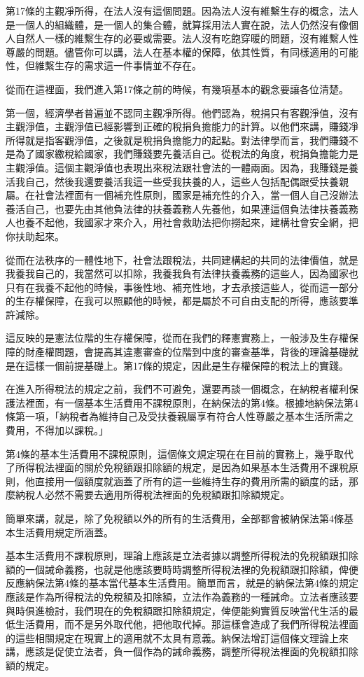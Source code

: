 \documentclass[]{ctexbook}
\begin{document}
第17條的主觀凈所得，在法人沒有這個問題。因為法人沒有維繫生存的概念，法人是一個人的組織體，是一個人的集合體，就算採用法人實在說，法人仍然沒有像個人自然人一樣的維繫生存的必要或需要。法人沒有吃飽穿暖的問題，沒有維繫人性尊嚴的問題。儘管你可以講，法人在基本權的保障，依其性質，有同樣適用的可能性，但維繫生存的需求這一件事情並不存在。

從而在這裡面，我們進入第17條之前的時候，有幾項基本的觀念要讓各位清楚。

第一個，經濟學者普遍並不認同主觀凈所得。他們認為，稅捐只有客觀淨值，沒有主觀淨值，主觀淨值已經影響到正確的稅捐負擔能力的計算。以他們來講，賺錢凈所得就是指客觀淨值，之後就是稅捐負擔能力的起點。對法律學而言，我們賺錢不是為了國家繳稅給國家，我們賺錢要先養活自己。從稅法的角度，稅捐負擔能力是主觀淨值。這個主觀淨值也表現出來稅法跟社會法的一體兩面。因為，我賺錢是養活我自己，然後我還要養活我這一些受我扶養的人，這些人包括配偶跟受扶養親屬。在社會法裡面有一個補充性原則，國家是補充性的介入，當一個人自己沒辦法養活自己，也要先由其他負法律的扶養義務人先養他，如果連這個負法律扶養義務人也養不起他，我國家才來介入，用社會救助法把你撈起來，建構社會安全網，把你扶助起來。

從而在法秩序的一體性地下，社會法跟稅法，共同建構起的共同的法律價值，就是我養我自己的，我當然可以扣除，我養我負有法律扶養義務的這些人，因為國家也只有在我養不起他的時候，事後性地、補充性地，才去承接這些人，從而這一部分的生存權保障，在我可以照顧他的時候，都是屬於不可自由支配的所得，應該要準許減除。

這反映的是憲法位階的生存權保障，從而在我們的釋憲實務上，一般涉及生存權保障的財產權問題，會提高其違憲審查的位階到中度的審查基準，背後的理論基礎就是在這樣一個前提基礎上。第17條的規定，因此是生存權保障的稅法上的實踐。

在進入所得稅法的規定之前，我們不可避免，還要再談一個概念，在納稅者權利保護法裡面，有一個基本生活費用不課稅原則，在納保法的第4條。根據地納保法第4條第一項，「納稅者為維持自己及受扶養親屬享有符合人性尊嚴之基本生活所需之費用，不得加以課稅。」

第4條的基本生活費用不課稅原則，這個條文規定現在在目前的實務上，幾乎取代了所得稅法裡面的關於免稅額跟扣除額的規定，是因為如果基本生活費用不課稅原則，他直接用一個額度就涵蓋了所有的這一些維持生存的費用所需的額度的話，那麼納稅人必然不需要去適用所得稅法裡面的免稅額跟扣除額規定。

簡單來講，就是，除了免稅額以外的所有的生活費用，全部都會被納保法第4條基本生活費用規定所涵蓋。

基本生活費用不課稅原則，理論上應該是立法者據以調整所得稅法的免稅額跟扣除額的一個誡命義務，也就是他應該要時時調整所得稅法裡的免稅額跟扣除額，俾便反應納保法第4條的基本當代基本生活費用。簡單而言，就是的納保法第4條的規定應該是作為所得稅法的免稅額及扣除額，立法作為義務的一種誡命。立法者應該要與時俱進檢討，我們現在的免稅額跟扣除額規定，俾便能夠實質反映當代生活的最低生活費用，而不是另外取代他，把他取代掉。那這樣會造成了我們所得稅法裡面的這些相關規定在現實上的適用就不太具有意義。納保法增訂這個條文理論上來講，應該是促使立法者，負一個作為的誡命義務，調整所得稅法裡面的免稅額扣除額的規定。
\end{document}
